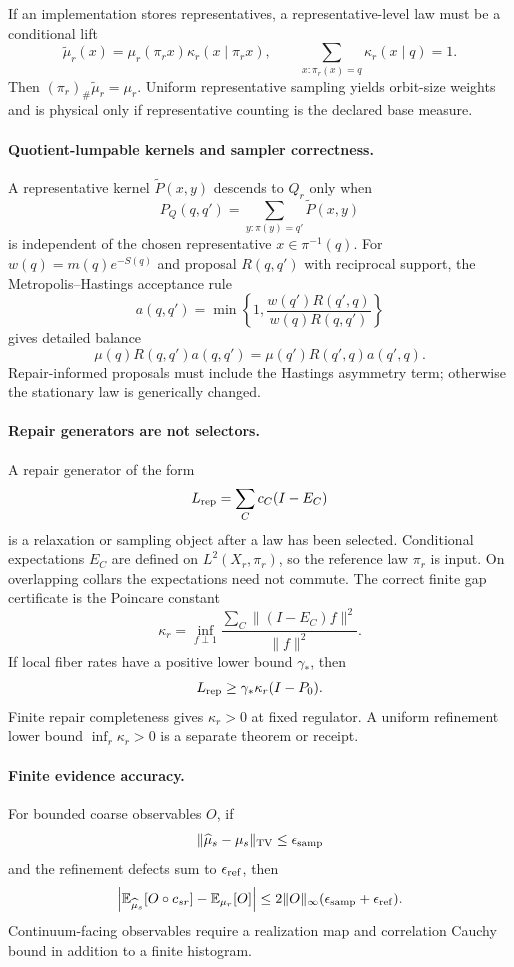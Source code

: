 If an implementation stores representatives, a representative-level law must be a conditional lift
\[
\widetilde\mu_r(x)=\mu_r(\pi_r x)\kappa_r(x\mid \pi_r x),
\qquad
\sum_{x:\pi_r(x)=q}\kappa_r(x\mid q)=1.
\]
Then \((\pi_r)_\#\widetilde\mu_r=\mu_r\).  Uniform representative sampling yields orbit-size
weights and is physical only if representative counting is the declared base measure.

\paragraph{Quotient-lumpable kernels and sampler correctness.}
A representative kernel \(\widetilde P(x,y)\) descends to \(Q_r\) only when
\[
P_Q(q,q')
=
\sum_{y:\pi(y)=q'}\widetilde P(x,y)
\]
is independent of the chosen representative \(x\in\pi^{-1}(q)\).  For
\(w(q)=m(q)e^{-S(q)}\) and proposal \(R(q,q')\) with reciprocal support, the
Metropolis--Hastings acceptance rule
\[
a(q,q')=\min\left\{1,
\frac{w(q')R(q',q)}{w(q)R(q,q')}
\right\}
\]
gives detailed balance
\[
\mu(q)R(q,q')a(q,q')=\mu(q')R(q',q)a(q',q).
\]
Repair-informed proposals must include the Hastings asymmetry term; otherwise the stationary law is
generically changed.

\paragraph{Repair generators are not selectors.}
A repair generator of the form
\[
L_{\rm rep}=\sum_C c_C(I-E_C)
\]
is a relaxation or sampling object after a law has been selected.  Conditional expectations
\(E_C\) are defined on \(L^2(X_r,\pi_r)\), so the reference law \(\pi_r\) is input.  On
overlapping collars the expectations need not commute.  The correct finite gap certificate is the
Poincare constant
\[
\kappa_r
=
\inf_{f\perp 1}
\frac{\sum_C\|(I-E_C)f\|^2}{\|f\|^2}.
\]
If local fiber rates have a positive lower bound \(\gamma_*\), then
\[
L_{\rm rep}\ge \gamma_*\kappa_r(I-P_0).
\]
Finite repair completeness gives \(\kappa_r>0\) at fixed regulator.  A uniform refinement lower
bound \(\inf_r\kappa_r>0\) is a separate theorem or receipt.

\paragraph{Finite evidence accuracy.}
For bounded coarse observables \(O\), if
\[
\|\widehat\mu_s-\mu_s\|_{\mathrm{TV}}\le\epsilon_{\rm samp}
\]
and the refinement defects sum to \(\epsilon_{\rm ref}\), then
\[
\left|\mathbb E_{\widehat\mu_s}[O\circ c_{sr}]-\mathbb E_{\mu_r}[O]\right|
\le
2\|O\|_\infty(\epsilon_{\rm samp}+\epsilon_{\rm ref}).
\]
Continuum-facing observables require a realization map and correlation Cauchy bound in addition to a
finite histogram.

